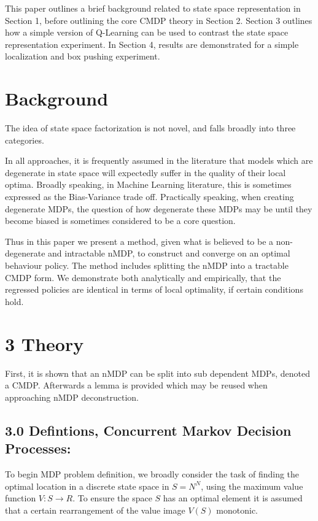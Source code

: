 \documentclass{article}
\begin{document}
This paper outlines a brief background related to state space representation in Section 1, before outlining the core CMDP theory in Section 2. Section 3 outlines how a simple version of Q-Learning can be used to contrast the state space representation experiment. In Section 4, results are demonstrated for a simple localization and box pushing experiment.

\section{Background}
The idea of state space factorization is not novel, and falls broadly into three categories. 


\bigskip

In all approaches, it is frequently assumed in the literature that models which are degenerate in state space will expectedly suffer in the quality of their local optima. Broadly speaking, in Machine Learning literature, this is sometimes expressed as the Bias-Variance trade off. Practically speaking, when creating degenerate MDPs, the question of how degenerate these MDPs may be until they become biased is sometimes considered to be a core question. 

Thus in this paper we present a method, given what is believed to be a non-degenerate and intractable nMDP, to construct and converge on an optimal behaviour policy. The method includes splitting the nMDP into a tractable CMDP form. We demonstrate both analytically and empirically, that the regressed policies are identical in terms of local optimality, if certain conditions hold.

\section{3 Theory}
First, it is shown that an nMDP can be split into sub dependent MDPs, denoted a CMDP. Afterwards a lemma is provided which may be reused when approaching nMDP deconstruction. 

\subsection{3.0 Defintions, Concurrent Markov Decision Processes:}
To begin MDP problem definition, we broadly consider the task of finding the optimal location in a discrete state space in  $S=N^N$, using the maximum value function  $V:S\rightarrow R$. To ensure the space  $S$ has an optimal element it is assumed that a certain rearrangement of the value image  $V\left(S\right)$ monotonic.
\end{document}
